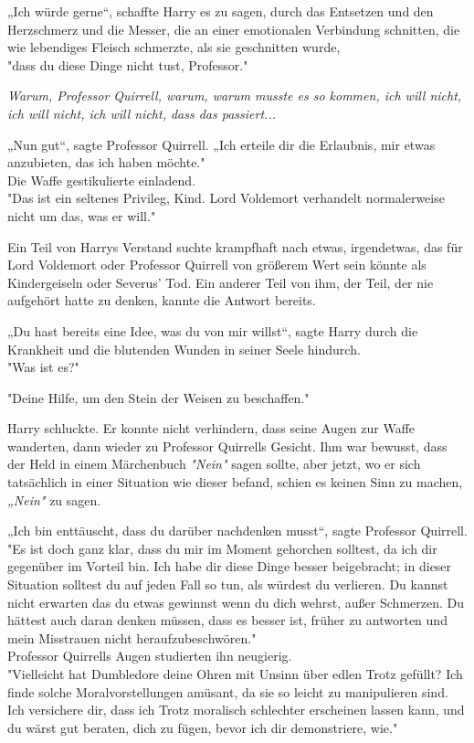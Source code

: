 {„Ich würde gerne“, schaffte Harry es zu sagen, durch das Entsetzen und den Herzschmerz und die Messer, die an einer emotionalen Verbindung schnitten, die wie lebendiges Fleisch schmerzte, als sie geschnitten wurde,\\ "dass du diese Dinge nicht tust, Professor."

\emph{Warum, Professor Quirrell, warum, warum musste es so kommen, ich will nicht, ich will nicht, ich will nicht, dass das passiert...}

„Nun gut“, sagte Professor Quirrell. „Ich erteile dir die Erlaubnis, mir etwas anzubieten, das ich haben möchte."\\ Die Waffe gestikulierte einladend.\\ "Das ist ein seltenes Privileg, Kind. Lord Voldemort verhandelt normalerweise nicht um das, was er will."

Ein Teil von Harrys Verstand suchte krampfhaft nach etwas, irgendetwas, das für Lord Voldemort oder Professor Quirrell von größerem Wert sein könnte als Kindergeiseln oder Severus' Tod. Ein anderer Teil von ihm, der Teil, der nie aufgehört hatte zu denken, kannte die Antwort bereits.

„Du hast bereits eine Idee, was du von mir willst“, sagte Harry durch die Krankheit und die blutenden Wunden in seiner Seele hindurch.\\ "Was ist es?"

"Deine Hilfe, um den Stein der Weisen zu beschaffen."

Harry schluckte. Er konnte nicht verhindern, dass seine Augen zur Waffe wanderten, dann wieder zu Professor Quirrells Gesicht. Ihm war bewusst, dass der Held in einem Märchenbuch \emph{"Nein"} sagen sollte, aber jetzt, wo er sich tatsächlich in einer Situation wie dieser befand, schien es keinen Sinn zu machen, \emph{„Nein"} zu sagen.

„Ich bin enttäuscht, dass du darüber nachdenken musst“, sagte Professor Quirrell.\\ "Es ist doch ganz klar, dass du mir im Moment gehorchen solltest, da ich dir gegenüber im Vorteil bin. Ich habe dir diese Dinge besser beigebracht; in dieser Situation solltest du auf jeden Fall so tun, als würdest du verlieren. Du kannst nicht erwarten das du etwas gewinnst wenn du dich wehrst, außer Schmerzen. Du hättest auch daran denken müssen, dass es besser ist, früher zu antworten und mein Misstrauen nicht heraufzubeschwören."\\ Professor Quirrells Augen studierten ihn neugierig.\\ "Vielleicht hat Dumbledore deine Ohren mit Unsinn über edlen Trotz gefüllt? Ich finde solche Moralvorstellungen amüsant, da sie so leicht zu manipulieren sind. Ich versichere dir, dass ich Trotz moralisch schlechter erscheinen lassen kann, und du wärst gut beraten, dich zu fügen, bevor ich dir demonstriere, wie."

}
